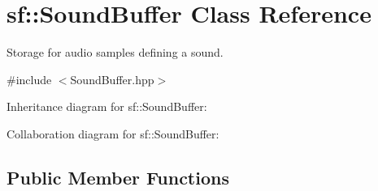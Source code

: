 \hypertarget{classsf_1_1_sound_buffer}{}\section{sf\+:\+:Sound\+Buffer Class Reference}
\label{classsf_1_1_sound_buffer}


Storage for audio samples defining a sound.  




{\ttfamily \#include $<$Sound\+Buffer.\+hpp$>$}



Inheritance diagram for sf\+:\+:Sound\+Buffer\+:


Collaboration diagram for sf\+:\+:Sound\+Buffer\+:
\subsection*{Public Member Functions}
